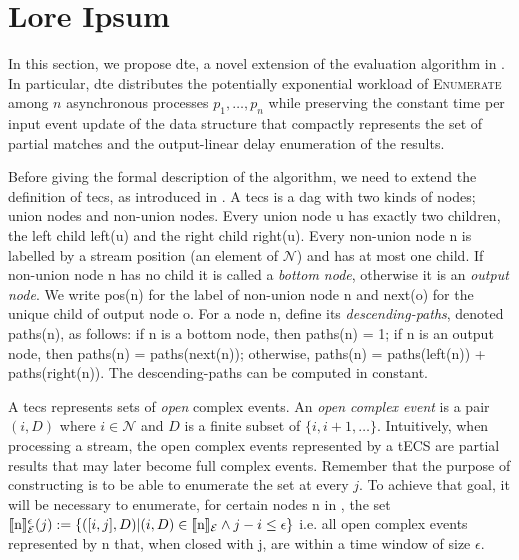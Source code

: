 \chapter{Lore Ipsum}\label{chapter:algorithm}

In this section, we propose \acrfull{dte}, a novel extension of the evaluation algorithm in \cite{core}. In particular, \acrshort{dte} distributes the potentially exponential workload of \textsc{Enumerate} among $n$ asynchronous processes $p_{1}, \ldots, p_{n}$ while preserving the constant time per input event update of the data structure that compactly represents the set of partial matches and the output-linear delay enumeration of the results.

Before giving the formal description of the algorithm, we need to extend the definition of \acrfull{tecs}, as introduced in \cite{core}. A \acrshort{tecs} is a \acrfull{dag} \tecs with two kinds of nodes; union nodes and non-union nodes. Every union node u has exactly two children, the left child left(u) and the right child right(u). Every non-union node n is labelled by a stream position (an element of $\mathcal{N}$) and has at most one child. If non-union node n has no child it is called a \emph{bottom node}, otherwise it is an \emph{output node}. We write pos(n) for the label of non-union node n and next(o) for the unique child of output node o. For a node n, define its \emph{descending-paths}, denoted paths(n), as follows: if n is a bottom node, then paths(n) = 1; if n is an output node, then paths(n) = paths(next(n)); otherwise, paths(n) = paths(left(n)) + paths(right(n)). The descending-paths can be computed in constant.

A \acrshort{tecs} represents sets of \emph{open} complex events. An \emph{open complex event} is a pair $(i, D)$ where $i \in \mathcal{N}$ and $D$ is a finite subset of $\{i, i+1, \ldots\}$. Intuitively, when processing a stream, the open complex events represented by a tECS are partial results that may later become full complex events. Remember that the purpose of constructing \tecs is to be able to enumerate the set \enumCEA at every $j$. To achieve that goal, it will be necessary to enumerate, for certain nodes n in \tecs, the set $\llbracket \text{n} \rrbracket^{\epsilon}_{\mathcal{E}}(j) := \{ ([i, j], D) | (i, D) \in \llbracket \text{n} \rrbracket_{\mathcal{E}} \land j - i \leq \epsilon \}$ i.e. all open complex events represented by n that, when closed with j, are within a time window of size $\epsilon$.

